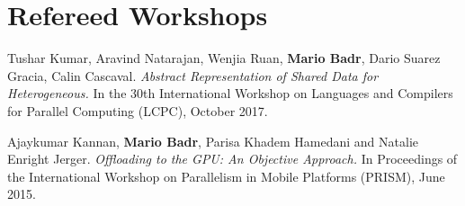 \section{\sc Refereed Workshops}

\onerow
{
  Tushar Kumar, Aravind Natarajan, Wenjia Ruan, \textbf{Mario Badr}, Dario Suarez Gracia, Calin Cascaval.
  \textit{Abstract Representation of Shared Data for Heterogeneous.}
  In the 30th International Workshop on Languages and Compilers for Parallel Computing (LCPC), October 2017.
}

\onerow
{
  Ajaykumar Kannan, \textbf{Mario Badr}, Parisa Khadem Hamedani and Natalie Enright Jerger.
  \textit{Offloading to the GPU: An Objective Approach.}
  In Proceedings of the International Workshop on Parallelism in Mobile Platforms (PRISM), June 2015.
}
